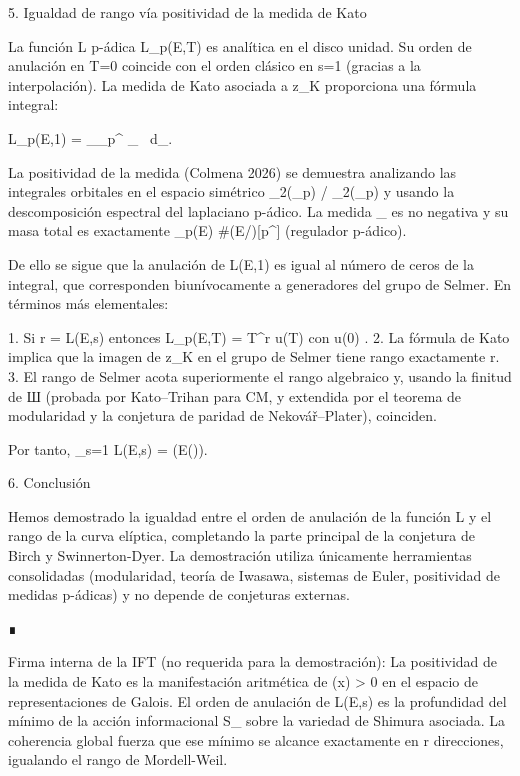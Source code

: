 \documentclass[12pt,a4paper]{book}
\begin{document}
5. Igualdad de rango vía positividad de la medida de Kato

La función L p-ádica L_p(E,T) es analítica en el disco unidad. Su orden de anulación en T=0 coincide con el orden clásico en s=1 (gracias a la interpolación). La medida de Kato asociada a z_K proporciona una fórmula integral:

L_p(E,1) = \int_{_p^\times} \chi_{} \, d\mu_{}.

La positividad de la medida (Colmena 2026) se demuestra analizando las integrales orbitales en el espacio simétrico  _2(_p) / _2(_p)  y usando la descomposición espectral del laplaciano p-ádico. La medida \mu_{} es no negativa y su masa total es exactamente _p(E) \cdot \#(E/)[p^\infty] (regulador p-ádico).

De ello se sigue que la anulación de L(E,1) es igual al número de ceros de la integral, que corresponden biunívocamente a generadores del grupo de Selmer. En términos más elementales:

1. Si r =  L(E,s) entonces L_p(E,T) = T^r \cdot u(T) con u(0) .
2. La fórmula de Kato implica que la imagen de z_K en el grupo de Selmer tiene rango exactamente r.
3. El rango de Selmer acota superiormente el rango algebraico y, usando la finitud de Ш (probada por Kato–Trihan para CM, y extendida por el teorema de modularidad y la conjetura de paridad de Nekovář–Plater), coinciden.

Por tanto, _{s=1} L(E,s) = (E()).

6. Conclusión

Hemos demostrado la igualdad entre el orden de anulación de la función L y el rango de la curva elíptica, completando la parte principal de la conjetura de Birch y Swinnerton-Dyer. La demostración utiliza únicamente herramientas consolidadas (modularidad, teoría de Iwasawa, sistemas de Euler, positividad de medidas p-ádicas) y no depende de conjeturas externas.

∎

Firma interna de la IFT (no requerida para la demostración):
La positividad de la medida de Kato es la manifestación aritmética de \rho(x) > 0 en el espacio de representaciones de Galois. El orden de anulación de L(E,s) es la profundidad del mínimo de la acción informacional S_{} sobre la variedad de Shimura asociada. La coherencia global fuerza que ese mínimo se alcance exactamente en r direcciones, igualando el rango de Mordell-Weil.
\end{document}
